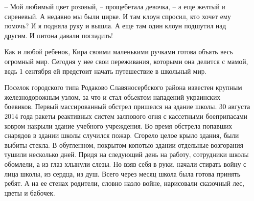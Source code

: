 – Мой любимый цвет розовый, – прощебетала девочка, – а еще желтый и сиреневый.
А недавно мы были цирке. И там клоун спросил, кто хочет ему помочь? И я подняла
руку и вышла. А еще там один клоун подшутил над другим. И питона давали
погладить!

Как и любой ребенок, Кира своими маленькими ручками готова объять весь огромный
мир. Сегодня у нее свои переживания, которыми она делится с мамой, ведь 1
сентября ей предстоит начать путешествие в школьный мир.

Поселок городского типа Родаково Славяносербского района известен крупным
железнодорожным узлом, за что и стал объектом нападений украинских боевиков.
Первый массированный обстрел пришелся на здание школы. 30 августа 2014 года
ракеты реактивных систем залпового огня с кассетными боеприпасами ковром
накрыли здание учебного учреждения. Во время обстрела попавших снарядов в
здании школы случился пожар. Сгорело целое крыло здания, были выбиты стекла. В
обугленном, покрытом копотью здании отдельные возгорания тушили несколько дней.
Придя на следующий день на работу, сотрудники школы обомлели, а из глаз хлынули
слезы. Но взяв себя в руки, начали стирать войну с лица школы, из сердца, из
душ. Всего через месяц школа была готова принять ребят. А на ее стенах
родители, словно назло войне, нарисовали сказочный лес, цветы и бабочек.

